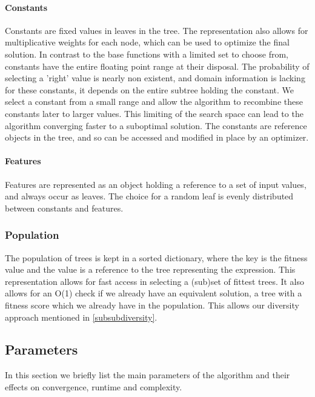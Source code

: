 \paragraph{Constants}
Constants are fixed values in leaves in the tree. The representation also allows for multiplicative weights for each node, which can be used to optimize the final solution. In contrast to the base functions with a limited set to choose from, constants have the entire floating point range at their disposal. The probability of selecting a 'right' value is nearly non existent, and domain information is lacking for these constants, it depends on the entire subtree holding the constant. We select a constant from a small range and allow the algorithm to recombine these constants later to larger values. This limiting of the search space can lead to the algorithm converging faster to a suboptimal solution.
The constants are reference objects in the tree, and so can be accessed and modified in place by an optimizer.

\paragraph{Features}
Features are represented as an object holding a reference to a set of input values, and always occur as leaves. The choice for a random leaf is evenly distributed between constants and features.

\subsubsection{Population}
The population of trees is kept in a sorted dictionary, where the key is the fitness value and the value is a reference to the tree representing the expression. 
This representation allows for fast access in selecting a (sub)set of fittest trees. It also allows for an O(1) check if we already have an equivalent solution, a tree with a fitness score which we already have in the population. This allows our diversity approach mentioned in \ref{subsubdiversity}.

\subsection{Parameters}
In this section we briefly list the main parameters of the algorithm and their effects on convergence, runtime and complexity.
